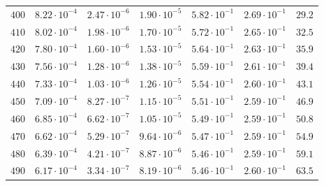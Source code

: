 \begin{table}
\begin{tabular}{ccccccc}
$400 $&$ 8.22\cdot 10^{-4}  $&$ 2.47\cdot 10^{-6}  $&$ 1.90\cdot 10^{-5}  $&$ 5.82\cdot 10^{-1}  $&$ 2.69\cdot 10^{-1}  $&$ 29.2 $\\
$410 $&$ 8.02\cdot 10^{-4}  $&$ 1.98\cdot 10^{-6}  $&$ 1.70\cdot 10^{-5}  $&$ 5.72\cdot 10^{-1}  $&$ 2.65\cdot 10^{-1}  $&$ 32.5 $\\
$420 $&$ 7.80\cdot 10^{-4}  $&$ 1.60\cdot 10^{-6}  $&$ 1.53\cdot 10^{-5}  $&$ 5.64\cdot 10^{-1}  $&$ 2.63\cdot 10^{-1}  $&$ 35.9 $\\
$430 $&$ 7.56\cdot 10^{-4}  $&$ 1.28\cdot 10^{-6}  $&$ 1.38\cdot 10^{-5}  $&$ 5.59\cdot 10^{-1}  $&$ 2.61\cdot 10^{-1}  $&$ 39.4 $\\
$440 $&$ 7.33\cdot 10^{-4}  $&$ 1.03\cdot 10^{-6}  $&$ 1.26\cdot 10^{-5}  $&$ 5.54\cdot 10^{-1}  $&$ 2.60\cdot 10^{-1}  $&$ 43.1 $\\
$450 $&$ 7.09\cdot 10^{-4}  $&$ 8.27\cdot 10^{-7}  $&$ 1.15\cdot 10^{-5}  $&$ 5.51\cdot 10^{-1}  $&$ 2.59\cdot 10^{-1}  $&$ 46.9 $\\
$460 $&$ 6.85\cdot 10^{-4}  $&$ 6.62\cdot 10^{-7}  $&$ 1.05\cdot10^{-5}  $&$ 5.49\cdot 10^{-1}  $&$ 2.59\cdot 10^{-1}  $&$ 50.8 $\\
$470 $&$ 6.62\cdot 10^{-4}  $&$ 5.29\cdot 10^{-7}  $&$ 9.64\cdot 10^{-6}  $&$ 5.47\cdot 10^{-1}  $&$ 2.59\cdot 10^{-1}  $&$ 54.9 $\\
$480 $&$ 6.39\cdot 10^{-4}  $&$ 4.21\cdot 10^{-7}  $&$ 8.87\cdot 10^{-6}  $&$ 5.46\cdot 10^{-1}  $&$ 2.59\cdot 10^{-1}  $&$ 59.1 $\\
$490 $&$ 6.17\cdot 10^{-4}  $&$ 3.34\cdot 10^{-7}  $&$ 8.19\cdot 10^{-6}  $&$ 5.46\cdot 10^{-1}  $&$ 2.60\cdot 10^{-1}  $&$ 63.5 $\\
\hline
  \end{tabular}
\end{table}

